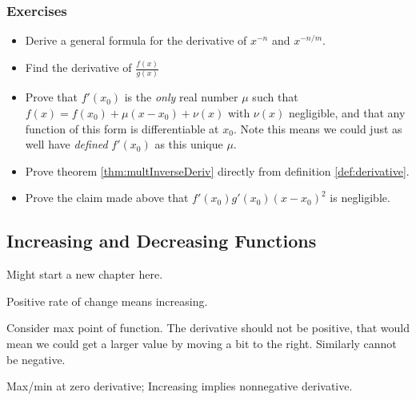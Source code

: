 \subsubsection{Exercises}
\begin{itemize}
\item Derive a general formula for the derivative of $x^{-n}$ and $x^{-n/m}$.
\item Find the derivative of $\frac{f(x)}{g(x)}$
\item Prove that $f'(x_0)$ is the \emph{only} real number $\mu$ such that $f(x) = f(x_0) + \mu(x-x_0) + \nu(x)$ with $\nu(x)$ negligible, and that any function of this form is differentiable at $x_0$. Note this means we could just as well have \emph{defined}  $f'(x_0)$ as this unique $\mu$.
\item Prove theorem \ref{thm:multInverseDeriv} directly from definition \ref{def:derivative}.
\item Prove the claim made above that $f'(x_0)g'(x_0)(x-x_0)^2$ is negligible.
\end{itemize}
%
%
%
%


\subsection{Increasing and Decreasing Functions}
{\color{red}
Might start a new chapter here. 

Positive rate of change means increasing.


Consider max point of function. The derivative should not be positive, that would mean we could get a larger value by moving a bit to the right. Similarly cannot be negative.

Max/min at zero derivative; Increasing implies nonnegative derivative.
}%


